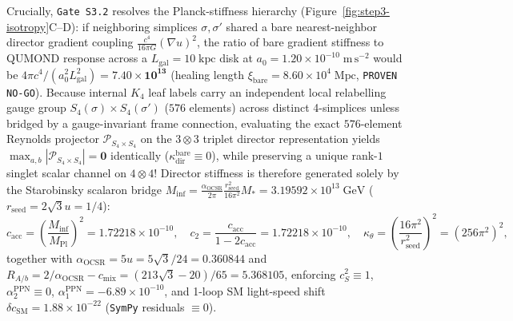 \documentclass[11pt,a4paper]{article}
\begin{document}
Crucially, \texttt{Gate S3.2} resolves the Planck-stiffness hierarchy (Figure~\ref{fig:step3-isotropy}C--D): if neighboring simplices $\sigma, \sigma'$ shared a bare nearest-neighbor director gradient coupling $\frac{c^4}{16\pi G}(\nabla u)^2$, the ratio of bare gradient stiffness to QUMOND response across a $L_{\mathrm{gal}} = 10\;\mathrm{kpc}$ disk at $a_0 = 1.20\times 10^{-10}\;\mathrm{m\,s^{-2}}$ would be $4\pi c^4/(a_0^2 L_{\mathrm{gal}}^2) = \mathbf{7.40\times 10^{13}}$ (healing length $\xi_{\mathrm{bare}} = 8.60\times 10^4\;\mathrm{Mpc}$, \texttt{PROVEN NO-GO}). Because internal $K_4$ leaf labels carry an independent local relabelling gauge group $S_4(\sigma)\times S_4(\sigma')$ ($576$ elements) across distinct 4-simplices unless bridged by a gauge-invariant frame connection, evaluating the exact $576$-element Reynolds projector $\mathcal{P}_{S_4\times S_4}$ on the $3\otimes 3$ triplet director representation yields $\max_{a,b}|\mathcal{P}_{S_4\times S_4}| = \mathbf{0}$ identically ($\kappa_{\mathrm{dir}}^{\mathrm{bare}} \equiv 0$), while preserving a unique rank-$1$ singlet scalar channel on $4\otimes 4$! Director stiffness is therefore generated solely by the Starobinsky scalaron bridge $M_{\mathrm{inf}} = \frac{\alpha_{\mathrm{OCSR}}}{2\pi}\frac{r_{\mathrm{seed}}^2}{16\pi^2}M_* = 3.19592\times 10^{13}\;\mathrm{GeV}$ ($r_{\mathrm{seed}} = 2\sqrt{3}u = 1/4$):
\begin{equation}
    c_{\mathrm{acc}} = \left(\frac{M_{\mathrm{inf}}}{M_{\mathrm{Pl}}}\right)^{\!2} = 1.72218\times 10^{-10}, \quad c_2 = \frac{c_{\mathrm{acc}}}{1 - 2c_{\mathrm{acc}}} = 1.72218\times 10^{-10}, \quad \kappa_\theta = \left(\frac{16\pi^2}{r_{\mathrm{seed}}^2}\right)^{\!2} = (256\pi^2)^2,
    \label{eq:derived-couplings}
\end{equation}
together with $\alpha_{\mathrm{OCSR}} = 5u = 5\sqrt{3}/24 = 0.360844$ and $R_{A/b} = 2/\alpha_{\mathrm{OCSR}} - c_{\mathrm{mix}} = (213\sqrt{3}-20)/65 = 5.368105$, enforcing $c_S^2 \equiv 1$, $\alpha_2^{\mathrm{PPN}} \equiv 0$, $\alpha_1^{\mathrm{PPN}} = -6.89\times 10^{-10}$, and 1-loop SM light-speed shift $\delta c_{\mathrm{SM}} = 1.88\times 10^{-22}$ (\texttt{SymPy} residuals $\equiv 0$).
\end{document}
